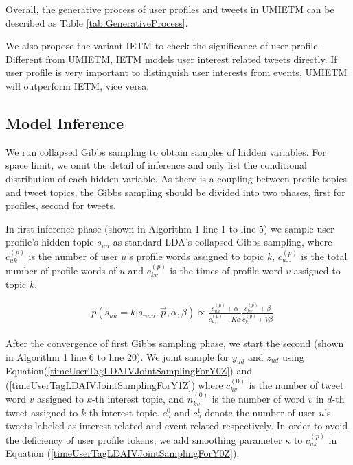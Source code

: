 \documentclass{llncs}
\begin{document}
Overall, the generative process of user profiles and tweets in UMIETM can be described as Table \ref{tab:GenerativeProcess}.

We also propose the variant IETM to check the significance of user profile.
Different from UMIETM, IETM models user interest related tweets directly. 
If user profile is very important to distinguish user interests from events, UMIETM will outperform IETM, vice versa.

\subsection{Model Inference}
We run collapsed Gibbs sampling to obtain samples of hidden variables.
For space limit, we omit the detail of inference and only list the conditional distribution of each hidden variable.
As there is a coupling between profile topics and tweet topics, the Gibbs sampling should be divided into two phases, first for profiles, second for tweets.

In first inference phase (shown in Algorithm 1 line 1 to line 5) we sample user profile's hidden topic \(s_{un}\) as standard LDA's collapsed Gibbs sampling\cite{griffiths2004finding}, where \(c^{(p)}_{uk}\) is the number of user \(u\)'s profile words assigned to topic \(k\), \(c^{(p)}_{u,.}\) is the total number of profile words of \(u\) and \(c^{(p)}_{kv}\) is the times of profile word \(v\) assigned to topic \(k\).
\begin{scriptsize}
\begin{equation}
\label{timeUserTagLDAIVsamplingForS}
\begin{aligned}
&p(s_{un}=k|s_{\neg{un}},\vec{p},\alpha,\beta)
\propto \frac{c^{(p)}_{uk}+\alpha}{c^{(p)}_{u,.}+K\alpha}
\frac{c^{(p)}_{kv}+\beta}{c^{(p)}_{k,.}+V\beta}
\end{aligned}
\end{equation}
\end{scriptsize}


After the convergence of first Gibbs sampling phase, we start the second (shown in Algorithm 1 line 6 to line 20).
We joint sample for \(y_{ud}\) and \(z_{ud}\) using Equation(\ref{timeUserTagLDAIVJointSamplingForY0Z}) and (\ref{timeUserTagLDAIVJointSamplingForY1Z}) where \(c^{(0)}_{kv}\) is the number of tweet word \(v\) assigned to \(k\)-th interest topic, and \(n^{(0)}_{kv}\) is the number of word \(v\) in \(d\)-th tweet assigned to \(k\)-th interest topic.
\(c_u^{0}\) and \(c_u^{1}\) denote the number of user \(u\)'s tweets labeled as interest related and event related respectively.
In order to avoid the deficiency of user profile tokens, we add smoothing parameter \(\kappa\) to \(c^{(p)}_{uk}\) in Equation (\ref{timeUserTagLDAIVJointSamplingForY0Z}).
\end{document}
